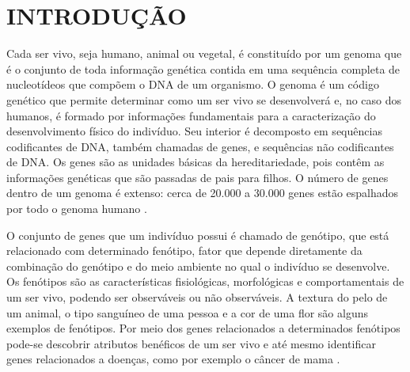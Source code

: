 \documentclass[
    12pt,
    a4paper,
    oneside,
    english,
    french,
    spanish,
    brazil
    ]{abntex2}
\begin{document}
\textual
\mainmatter
\pagestyle{simple}

\chapter{\textbf{INTRODUÇÃO}}

Cada ser vivo, seja humano, animal ou vegetal, é constituído por um genoma que é o conjunto de toda informação genética contida em uma sequência completa de nucleotídeos que compõem o DNA de um organismo. O genoma é um código genético que permite determinar como um ser vivo se desenvolverá e, no caso dos humanos, é formado por informações fundamentais para a caracterização do desenvolvimento físico do indivíduo. Seu interior é decomposto em sequências codificantes de DNA, também chamadas de genes, e sequências não codificantes de DNA. Os genes são as unidades básicas da hereditariedade, pois contêm as informações genéticas que são passadas de pais para filhos. O número de genes dentro de um genoma é extenso: cerca de 20.000 a 30.000 genes estão espalhados por todo o genoma humano \cite{laird2010}.

O conjunto de genes que um indivíduo possui é chamado de genótipo, que está relacionado com determinado fenótipo, fator que depende diretamente da combinação do genótipo e do meio ambiente no qual o indivíduo se desenvolve. Os fenótipos são as características fisiológicas, morfológicas e comportamentais de um ser vivo, podendo ser observáveis ou não observáveis. A textura do pelo de um animal, o tipo sanguíneo de uma pessoa e a cor de uma flor são alguns exemplos de fenótipos. Por meio dos genes relacionados a determinados fenótipos pode-se descobrir atributos benéficos de um ser vivo e até mesmo identificar genes relacionados a doenças, como por exemplo o câncer de mama \cite{Setiawan2018}.
\end{document}
